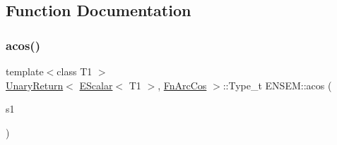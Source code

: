 \subsection{Function Documentation}
\mbox{\label{group__escalar_gac8e90d16773622bd9971db55f0c125c9}} 
\subsubsection{\texorpdfstring{acos()}{acos()}}
{\footnotesize\ttfamily template$<$class T1 $>$ \\
\mbox{\hyperlink{structENSEM_1_1UnaryReturn}{Unary\+Return}}$<$ \mbox{\hyperlink{classENSEM_1_1EScalar}{E\+Scalar}}$<$ T1 $>$, \mbox{\hyperlink{structENSEM_1_1FnArcCos}{Fn\+Arc\+Cos}} $>$\+::Type\+\_\+t E\+N\+S\+E\+M\+::acos (\begin{DoxyParamCaption}\item[{const \mbox{\hyperlink{classENSEM_1_1EScalar}{E\+Scalar}}$<$ T1 $>$ \&}]{s1 }\end{DoxyParamCaption})\hspace{0.3cm}{\ttfamily [inline]}}

